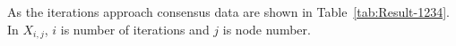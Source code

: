 \documentclass[conference]{IEEEtran}
\begin{document}
As the iterations approach consensus data are shown in Table~\ref{tab:Result-1234}. In $X_{i,j}$, $i$ is number of iterations and $j$ is node number.

\end{document}
